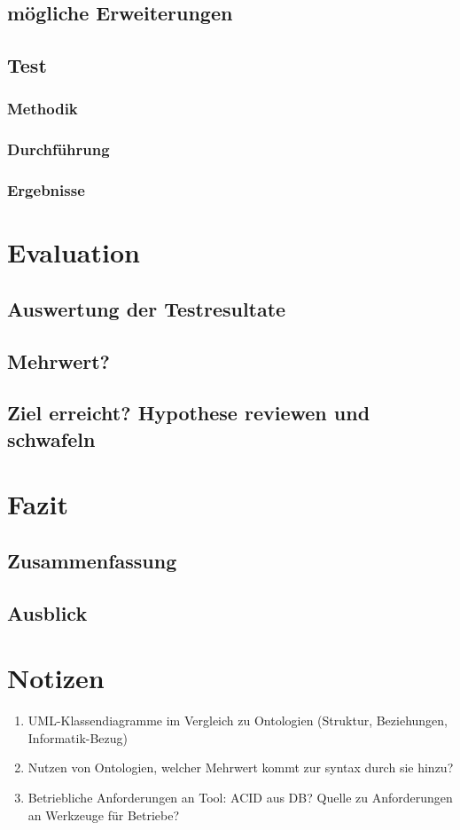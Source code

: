 \documentclass[12pt]{report}
\begin{document}
\section{mögliche Erweiterungen}
\section{Test}
\subsection{Methodik}
\subsection{Durchführung}
\subsection{Ergebnisse}
\chapter{Evaluation}
\section{Auswertung der Testresultate}
\section{Mehrwert?}
\section{Ziel erreicht? Hypothese reviewen und schwafeln}
\chapter{Fazit}
\section{Zusammenfassung}
\section{Ausblick}

\chapter{Notizen}
\begin{enumerate}
\item UML-Klassendiagramme im Vergleich zu Ontologien (Struktur, Beziehungen, Informatik-Bezug)
\item Nutzen von Ontologien, welcher Mehrwert kommt zur syntax durch sie hinzu?
\item Betriebliche Anforderungen an Tool: ACID aus DB? Quelle zu Anforderungen an Werkzeuge für Betriebe?
\end{enumerate}
\end{document}
